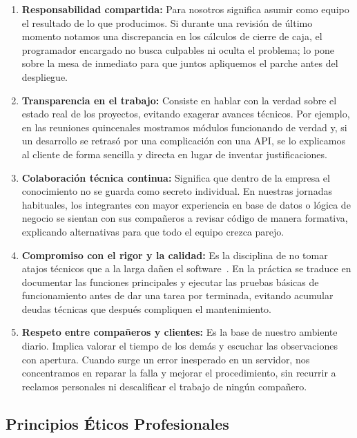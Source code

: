 \documentclass[12pt,a4paper,oneside]{article}
\begin{document}
\begin{enumerate}[leftmargin=1.8em,itemsep=4pt]
    \item \textbf{Responsabilidad compartida:} Para nosotros significa asumir como equipo el resultado de lo que producimos. Si durante una revisión de último momento notamos una discrepancia en los cálculos de cierre de caja, el programador encargado no busca culpables ni oculta el problema; lo pone sobre la mesa de inmediato para que juntos apliquemos el parche antes del despliegue.

    \item \textbf{Transparencia en el trabajo:} Consiste en hablar con la verdad sobre el estado real de los proyectos, evitando exagerar avances técnicos. Por ejemplo, en las reuniones quincenales mostramos módulos funcionando de verdad y, si un desarrollo se retrasó por una complicación con una API, se lo explicamos al cliente de forma sencilla y directa en lugar de inventar justificaciones.

    \item \textbf{Colaboración técnica continua:} Significa que dentro de la empresa el conocimiento no se guarda como secreto individual. En nuestras jornadas habituales, los integrantes con mayor experiencia en base de datos o lógica de negocio se sientan con sus compañeros a revisar código de manera formativa, explicando alternativas para que todo el equipo crezca parejo.

    \item \textbf{Compromiso con el rigor y la calidad:} Es la disciplina de no tomar atajos técnicos que a la larga dañen el software~\cite{sommerville2011}. En la práctica se traduce en documentar las funciones principales y ejecutar las pruebas básicas de funcionamiento antes de dar una tarea por terminada, evitando acumular deudas técnicas que después compliquen el mantenimiento.

    \item \textbf{Respeto entre compañeros y clientes:} Es la base de nuestro ambiente diario. Implica valorar el tiempo de los demás y escuchar las observaciones con apertura. Cuando surge un error inesperado en un servidor, nos concentramos en reparar la falla y mejorar el procedimiento, sin recurrir a reclamos personales ni descalificar el trabajo de ningún compañero.
\end{enumerate}

\subsection{Principios Éticos Profesionales}
\end{document}
